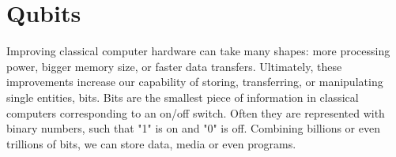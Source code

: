 
\section{Qubits}
Improving classical computer hardware can take many shapes: more processing power, bigger memory size, or faster data transfers. Ultimately, these improvements increase our capability of storing, transferring, or manipulating single entities, bits. Bits are the smallest piece of information in classical computers corresponding to an on/off switch. Often they are represented with binary numbers, such that "1" is on and "0" is off. Combining billions or even trillions of bits, we can store data, media or even programs.

